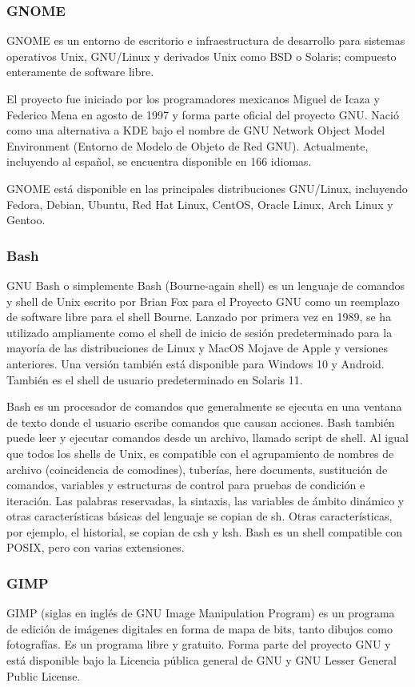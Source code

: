 \subsubsection{GNOME}
GNOME es un entorno de escritorio e infraestructura de desarrollo para sistemas operativos Unix,  GNU/Linux y derivados Unix como BSD o Solaris; compuesto enteramente de software libre.

El proyecto fue iniciado por los programadores mexicanos Miguel de Icaza y Federico Mena en agosto de 1997 y forma parte oficial del proyecto GNU. Nació como una alternativa a KDE bajo el nombre de GNU Network Object Model Environment (Entorno de Modelo de Objeto de Red GNU). Actualmente, incluyendo al español, se encuentra disponible en 166 idiomas.

GNOME está disponible en las principales distribuciones GNU/Linux, incluyendo Fedora, Debian, Ubuntu, Red Hat Linux, CentOS, Oracle Linux, Arch Linux y Gentoo.

\subsubsection{Bash}
GNU Bash o simplemente Bash (Bourne-again shell) es un lenguaje de comandos y shell de Unix escrito por Brian Fox para el Proyecto GNU como un reemplazo de software libre para el shell Bourne. Lanzado por primera vez en 1989, se ha utilizado ampliamente como el shell de inicio de sesión predeterminado para la mayoría de las distribuciones de Linux y MacOS Mojave de Apple y versiones anteriores. Una versión también está disponible para Windows 10 y Android. También es el shell de usuario predeterminado en Solaris 11.

Bash es un procesador de comandos que generalmente se ejecuta en una ventana de texto donde el usuario escribe comandos que causan acciones. Bash también puede leer y ejecutar comandos desde un archivo, llamado script de shell. Al igual que todos los shells de Unix, es compatible con el agrupamiento de nombres de archivo (coincidencia de comodines), tuberías, here documents, sustitución de comandos, variables y estructuras de control para pruebas de condición e iteración. Las palabras reservadas, la sintaxis, las variables de ámbito dinámico y otras características básicas del lenguaje se copian de sh. Otras características, por ejemplo, el historial, se copian de csh y ksh. Bash es un shell compatible con POSIX, pero con varias extensiones.

\subsubsection{GIMP}
GIMP (siglas en inglés de GNU Image Manipulation Program) es un programa de edición de imágenes digitales en forma de mapa de bits, tanto dibujos como fotografías. Es un programa libre y gratuito. Forma parte del proyecto GNU y está disponible bajo la Licencia pública general de GNU y GNU Lesser General Public License.

